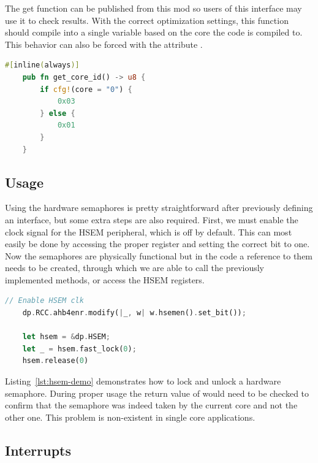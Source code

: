 The get  function can be published from this mod so users of this interface may use it to check results. With the correct optimization settings, this function should compile into a single variable based on the core the code is compiled to. This behavior can also be forced with the attribute .

\begin{lstlisting}[language=Rust,frame=single,float=!ht,style=customrust,label={lst:get-core-id},caption={The \mycode{get_core_id()} funtion}]
    #[inline(always)]
    pub fn get_core_id() -> u8 {
        if cfg!(core = "0") {
            0x03
        } else {
            0x01
        }
    }
\end{lstlisting}

\subsection{Usage}

Using the hardware semaphores is pretty straightforward after previously defining an interface, but some extra steps are also required. First, we must enable the clock signal for the HSEM peripheral, which is off by default. This can most easily be done by accessing the proper register and setting the correct bit to one. Now the semaphores are physically functional but in the code a reference to them needs to be created, through which we are able to call the previously implemented methods, or access the HSEM registers.

\begin{lstlisting}[language=Rust,frame=single,float=!ht,style=customrust,label={lst:hsem-demo},caption={Demonstration of HSEM Usage}]
    // Enable HSEM clk
    dp.RCC.ahb4enr.modify(|_, w| w.hsemen().set_bit());

    let hsem = &dp.HSEM;
    let _ = hsem.fast_lock(0);
    hsem.release(0)
\end{lstlisting}

Listing~\ref{lst:hsem-demo} demonstrates how to lock and unlock a hardware semaphore. During proper usage the return value of  would need to be checked to confirm that the semaphore was indeed taken by the current core and not the other one. This problem is non-existent in single core applications.

\subsection{Interrupts}

